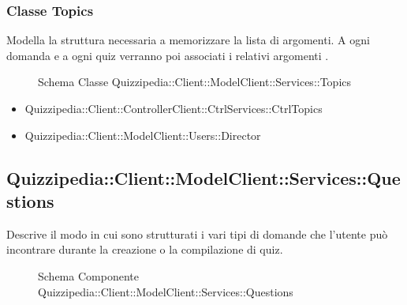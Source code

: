 \subsubsection{Classe Topics}
Modella la struttura necessaria a memorizzare la lista di argomenti. A ogni domanda e a ogni quiz verranno poi associati i relativi argomenti .
\begin{figure}[H]
\centering
\noindent{}
\caption[Schema Classe Topics]{Schema Classe Quizzipedia::Client::ModelClient::Services::Topics}
\end{figure}
\begin{itemize}
\item Quizzipedia::Client::ControllerClient::CtrlServices::CtrlTopics
\item Quizzipedia::Client::ModelClient::Users::Director
\end{itemize}
\subsection{Quizzipedia::Client::ModelClient::Services::Questions}
Descrive il modo in cui sono strutturati i vari tipi di domande che l'utente può incontrare durante la creazione o la compilazione di quiz.
\begin{figure}[H]
\centering
\noindent{}
\caption[Schema Componente Quizzipedia::Client::ModelClient::Services::Questions]{Schema Componente Quizzipedia::Client::ModelClient::Services::Questions}
\end{figure}
